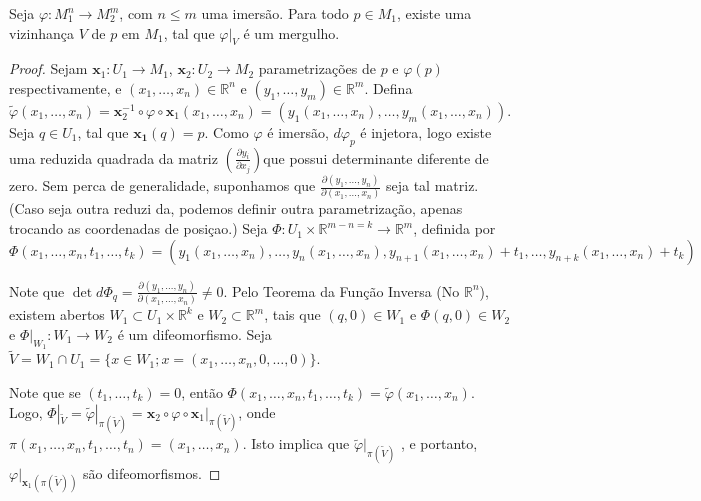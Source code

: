\begin{proposition}
    \label{loc:prop_4_:_toda_imersão_é_localmente_um_mergulho}
    Seja $\varphi:M_{1}^{n}\to M_{2}^{m}$, com $n\leq m$ uma imersão. Para todo $p \in M_{1}$, existe uma vizinhança $V$ de $p$ em $M_{1}$, tal que $\varphi|_{V}$ é um mergulho.
    \begin{proof}

        Sejam $\mathbf{x}_{1}:U_{1}\to M_{1}$, $\mathbf{x}_{2}:U_{2}\to M_{2}$ parametrizações de $p$ e $\varphi(p)$ respectivamente, e $(x_{1}, \dots, x_{n}) \in \mathbb{R}^{n}$ e $(y_{1}, \dots, y_{m}) \in \mathbb{R}^{m}$.
        Defina $\tilde{\varphi}(x_{1}, \dots, x_{n})=\mathbf{x}_{2}^{-1} \circ \varphi \circ \mathbf{x}_{1}(x_{1}, \dots, x_{n})=(y_{1}(x_{1}, \dots, x_{n}), \dots, y_{m}(x_{1}, \dots, x_{n}))$.
        Seja $q \in U_{1}$, tal que $\mathbf{x_{1}}(q)=p$.
        Como $\varphi$ é imersão, $d\varphi_{p}$ é injetora, logo existe uma reduzida quadrada da matriz $\left( \frac{\partial y_{i}}{\partial x_{j}} \right)$que possui determinante diferente de zero. Sem perca de generalidade, suponhamos que $\frac{\partial(y_{1}, \dots, y_{n})}{\partial(x_{1}, \dots,x_{n})}$ seja tal matriz. (Caso seja outra reduzi da, podemos definir outra parametrização, apenas trocando as coordenadas de posiçao.)
        Seja $\Phi:U_{1} \times \mathbb{R}^{m-n=k}\to \mathbb{R}^{m}$, definida por
        \begin{equation*}
            \Phi(x_{1}, \dots, x_{n}, t_{1}, \dots, t_{k})= (y_{1}(x_{1}, \dots, x_{n}), \dots, y_{n}(x_{1}, \dots, x_{n}), y_{n+1}(x_{1}, \dots, x_{n})+t_{1}, \dots, y_{n+k}(x_{1}, \dots, x_{n})+t_{k})
        \end{equation*}

        Note que $\det d\Phi_{q}=\frac{\partial(y_{1}, \dots, y_{n})}{\partial(x_{1}, \dots,x_{n})} \neq0$.
        Pelo Teorema da Função Inversa (No $\mathbb{R}^{n}$), existem abertos $W_{1} \subset U_{1}\times \mathbb{R}^{k}$ e $W_{2} \subset \mathbb{R}^{m}$, tais que $(q, 0) \in W_{1}$ e $\Phi(q, 0) \in W_{2}$ e $\Phi|_{W_{1}}:W_{1}\to W_{2}$ é um difeomorfismo.
        Seja $\tilde{V}=W_{1} \cap U_{1} = \{ x \in W_{1}; x=(x_{1}, \dots, x_{n}, 0, \dots, 0) \}$.

        Note que se $(t_{1}, \dots, t_{k})=0$, então $\Phi(x_{1}, \dots, x_{n}, t_{1}, \dots, t_{k})=\tilde{\varphi}(x_{1}, \dots, x_{n})$. Logo, $\Phi|_{\tilde{V}}=\tilde{\varphi}|_{\pi(\tilde{V})}=\mathbf{x}_{2}\circ \varphi \circ \mathbf{x}_{1}|_{\pi(\tilde{V})}$, onde $\pi(x_{1}, \dots, x_{n}, t_{1}, \dots, t_{n})=(x_{1}, \dots, x_{n})$.
        Isto implica que $\tilde{\varphi}|_{\pi(\tilde{V})}$ , e portanto, $\varphi|_{\mathbf{x}_{1}(\pi(\tilde{V}))}$ são difeomorfismos.
    \end{proof}
\end{proposition}
